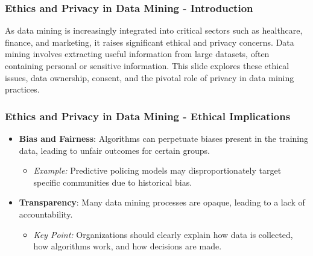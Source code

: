 \documentclass{beamer}
\begin{document}
\begin{frame}[fragile]
    \frametitle{Ethics and Privacy in Data Mining - Introduction}
    As data mining is increasingly integrated into critical sectors such as healthcare, finance, and marketing, it raises significant ethical and privacy concerns. Data mining involves extracting useful information from large datasets, often containing personal or sensitive information. This slide explores these ethical issues, data ownership, consent, and the pivotal role of privacy in data mining practices.
\end{frame}

\begin{frame}[fragile]
    \frametitle{Ethics and Privacy in Data Mining - Ethical Implications}
    \begin{itemize}
        \item \textbf{Bias and Fairness}: Algorithms can perpetuate biases present in the training data, leading to unfair outcomes for certain groups.
        \begin{itemize}
            \item \textit{Example:} Predictive policing models may disproportionately target specific communities due to historical bias.
        \end{itemize}
        
        \item \textbf{Transparency}: Many data mining processes are opaque, leading to a lack of accountability.
        \begin{itemize}
            \item \textit{Key Point:} Organizations should clearly explain how data is collected, how algorithms work, and how decisions are made.
        \end{itemize}
    \end{itemize}
\end{frame}
\end{document}
